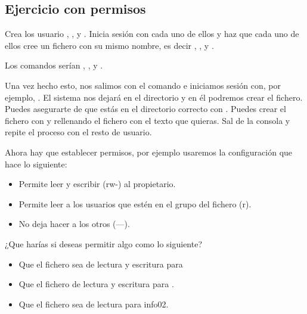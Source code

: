 \documentclass[letterpaper,10pt,spanish]{sphinxmanual}
\begin{document}
\subsection{Ejercicio con permisos}
\label{\detokenize{tema_pautas_seguridad_informatica/tema_pautas_seguridad_informatica:ejercicio-con-permisos}}
Crea los usuario , ,  y . Inicia sesión con cada uno de ellos y haz que cada uno de ellos cree un fichero con su mismo nombre, es decir , ,  y .

Los comandos serían , ,  y .

Una vez hecho esto, nos salimos con el comando  e iniciamos sesión con, por ejemplo, . El sistema nos dejará en el directorio  y en él podremos crear el fichero. Puedes asegurarte de que estás en el directorio correcto con  . Puedes crear el fichero con  y rellenando el fichero con el texto que quieras. Sal de la consola y repite el proceso con el resto de usuario.

Ahora hay que establecer permisos, por ejemplo usaremos la configuración  que hace lo siguiente:
\begin{itemize}
\item {} 
Permite leer y escribir (rw-) al propietario.

\item {} 
Permite leer a los usuarios que estén en el grupo del fichero (r\textendash{}).

\item {} 
No deja hacer  a los otros (—).

\end{itemize}

¿Que harías si deseas permitir algo como lo siguiente?
\begin{itemize}
\item {} 
Que el fichero   sea de lectura y escritura para 

\item {} 
Que el fichero   de lectura y escritura para .

\item {} 
Que el fichero   sea de lectura para info02.

\end{itemize}
\end{document}
